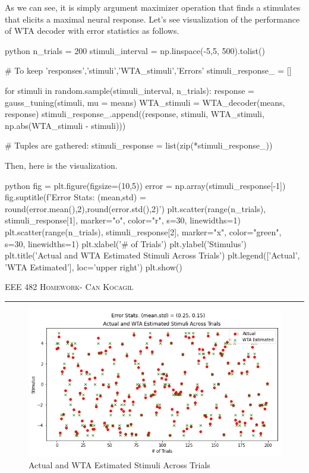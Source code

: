 \documentclass[12pt]{amsart}
\begin{document}
As we can see, it is simply argument maximizer operation that finds a stimulates that elicits a maximal neural response. Let's see visualization of the performance of WTA decoder with error statistics as follows.

\begin{mintedbox}{python}
n_trials = 200
stimuli_interval = np.linspace(-5,5, 500).tolist()

# To keep 'responses','stimuli','WTA_stimuli','Errors'
stimuli_response_ = []

for stimuli in random.sample(stimuli_interval, n_trials):
    response = gauss_tuning(stimuli, mu = means)
    WTA_stimuli = WTA_decoder(means, response)
    stimuli_response_.append((response, stimuli, WTA_stimuli, np.abs(WTA_stimuli - stimuli)))
 
# Tuples are gathered:
stimuli_response = list(zip(*stimuli_response_))
\end{mintedbox}

Then, here is the visualization.

\begin{mintedbox}{python}
fig = plt.figure(figsize=(10,5))
error = np.array(stimuli_response[-1])
fig.suptitle(f'Error Stats: (mean,std) = {round(error.mean(),2),round(error.std(),2)}')
plt.scatter(range(n_trials), stimuli_response[1], marker="o", color="r", s=30, linewidths=1)
plt.scatter(range(n_trials), stimuli_response[2], marker="x", color="green", s=30, linewidths=1)
plt.xlabel('# of Trials')
plt.ylabel('Stimulus')
plt.title('Actual and WTA Estimated Stimuli Across Trials')
plt.legend(['Actual', 'WTA Estimated'], loc='upper right')
plt.show()
\end{mintedbox}


\newpage
{\scshape EEE 482} \hfill {\scshape \large  Homework-\relax} \hfill {\scshape Can Kocagil}
\smallskip
\hrule
\vspace{2mm}

\begin{figure}[h]
    \centering
        \includegraphics[width = 1\textwidth]{images/Q2/WTA.png}
        \caption{Actual and WTA Estimated Stimuli Across Trials}
\end{figure}
\end{document}

